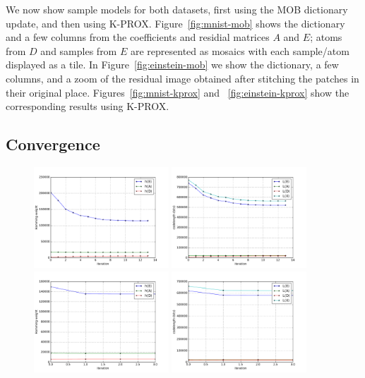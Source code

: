 \documentclass[twocolumn]{IEEEtran}
\theoremstyle{definition}
\begin{document}
We now show sample models for both datasets, first using the MOB dictionary update, and then using K-PROX. Figure~\ref{fig:mnist-mob} shows the dictionary and a few columns from the coefficients and residial matrices $A$ and $E$; atoms from $D$ and samples from $E$ are represented as mosaics with each sample/atom displayed as a tile. In Figure~\ref{fig:einstein-mob} we show the dictionary, a few columns, and a zoom of the residual image obtained after stitching the patches in their original place. Figures~\ref{fig:mnist-kprox} and ~\ref{fig:einstein-kprox} show the corresponding results using K-PROX.

\subsection{Convergence}
%
\begin{figure}[tp]
\centering\includegraphics[width=0.45\textwidth]{fig/conv-mob-einstein-h.pdf}%
\includegraphics[width=0.45\textwidth]{fig/conv-mob-einstein-L.pdf}\\
\includegraphics[width=0.45\textwidth]{fig/conv-kprox-einstein-h.pdf}%
\includegraphics[width=0.45\textwidth]{fig/conv-kprox-einstein-L.pdf}%

\end{figure}
\end{document}

